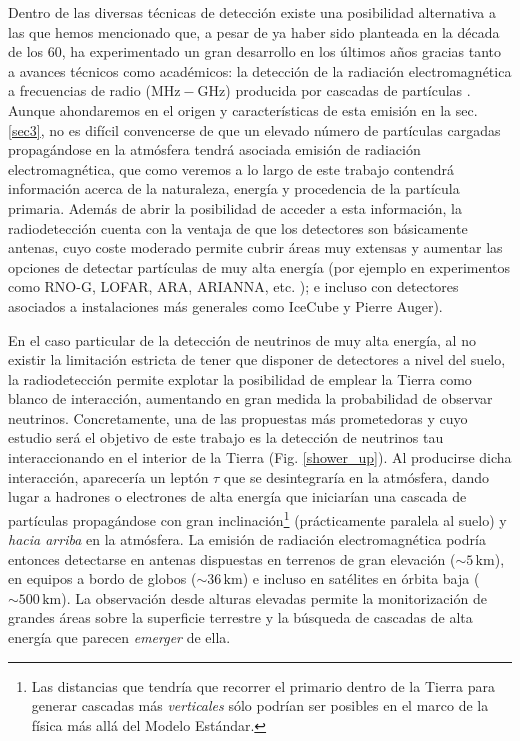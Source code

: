 \documentclass[12 pt, a4paper]{article} %
\numberwithin{equation}{section}
\numberwithin{figure}{section}
\numberwithin{table}{section}
\begin{document}
	Dentro de las diversas técnicas de detección existe una posibilidad alternativa a las que hemos mencionado que, a pesar de ya haber sido planteada en la década de los 60, ha experimentado un gran desarrollo en los últimos años gracias tanto a avances técnicos como académicos: la detección de la radiación electromagnética a frecuencias de radio ($\mathrm{MHz-GHz}$) producida por cascadas de partículas \cite{schroder2017radio}. Aunque ahondaremos en el origen y características de esta emisión en la sec. \ref{sec3}, no es difícil convencerse de que un elevado número de partículas cargadas propagándose en la atmósfera tendrá asociada emisión de radiación electromagnética, que como veremos a lo largo de este trabajo contendrá información acerca de la naturaleza, energía y procedencia de la partícula primaria. Además de abrir la posibilidad de acceder a esta información, la radiodetección cuenta con la ventaja de que los detectores son básicamente antenas, cuyo coste moderado permite cubrir áreas muy extensas y aumentar las opciones de detectar partículas de muy alta energía (por ejemplo en experimentos como RNO-G, LOFAR, ARA, ARIANNA, etc. \cite{schroder2017radio}); e incluso con detectores asociados a instalaciones más generales como IceCube y Pierre Auger).
	
	En el caso particular de la detección de neutrinos de muy alta energía, al no existir la limitación estricta de tener que disponer de detectores a nivel del suelo, la radiodetección permite explotar la posibilidad de emplear la Tierra como blanco de interacción, aumentando en gran medida la probabilidad de observar neutrinos. Concretamente, una de las propuestas más prometedoras y cuyo estudio será el objetivo de este trabajo es la detección de neutrinos tau interaccionando en el interior de la Tierra (Fig. \ref{shower_up}). Al producirse dicha interacción, aparecería un leptón $\tau$ que se desintegraría  en la atmósfera, dando lugar a hadrones o electrones de alta energía que iniciarían una cascada de partículas propagándose con gran inclinación\footnote{ Las distancias que tendría que recorrer el primario dentro de la Tierra para generar cascadas más \textit{verticales} sólo podrían ser posibles en el marco de la física más allá del Modelo Estándar.} (prácticamente paralela al suelo) y \textit{hacia arriba} en la atmósfera. La emisión de radiación electromagnética podría entonces detectarse en antenas dispuestas en terrenos de gran elevación ($\sim 5\,\mathrm{km}$), en equipos a bordo de globos ($\sim 36\,\mathrm{km}$) e incluso en satélites en órbita baja ($\sim 500\,\mathrm{km}$). La observación desde alturas elevadas permite la monitorización de grandes áreas sobre la superficie terrestre y la búsqueda de cascadas de alta energía que parecen \textit{emerger} de ella.
\end{document}

